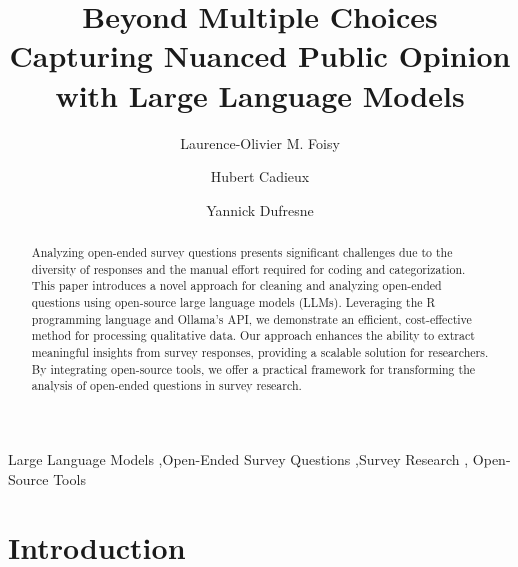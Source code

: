 \documentclass[
  authoryear,
  preprint,
  3p]{elsarticle}
\begin{document}
\begin{frontmatter}
\title{Beyond Multiple Choices \\\large{Capturing Nuanced Public Opinion
with Large Language Models} }
\author[1]{Laurence-Olivier M. Foisy%
%
}
\author[1]{Hubert Cadieux%
%
}
\author[1]{Yannick Dufresne%
%
}





        
\begin{abstract}
Analyzing open-ended survey questions presents significant challenges
due to the diversity of responses and the manual effort required for
coding and categorization. This paper introduces a novel approach for
cleaning and analyzing open-ended questions using open-source large
language models (LLMs). Leveraging the R programming language and
Ollama's API, we demonstrate an efficient, cost-effective method for
processing qualitative data. Our approach enhances the ability to
extract meaningful insights from survey responses, providing a scalable
solution for researchers. By integrating open-source tools, we offer a
practical framework for transforming the analysis of open-ended
questions in survey research.
\end{abstract}





\begin{keyword}
    Large Language Models \sep Open-Ended Survey Questions \sep Survey
Research \sep 
    Open-Source Tools
\end{keyword}
\end{frontmatter}
    
\section{Introduction}\label{introduction}
\end{document}
